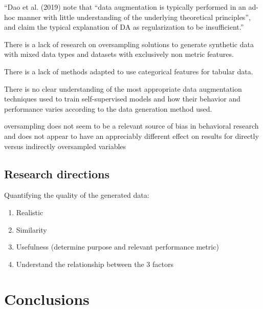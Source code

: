 \documentclass[parskip=full]{scrartcl}
\begin{document}
``Dao et al. (2019) note that ``data augmentation is typically performed in an
ad-hoc manner with little understanding of the underlying theoretical
principles'', and claim the typical explanation of DA as regularization to be
insufficient.''~\cite{feng2021survey}

There is a lack of research on oversampling solutions to generate synthetic
data with mixed data types and datasets with exclusively non metric features.

There is a lack of methods adapted to use categorical features for tabular
data.



There is no clear understanding of the most appropriate data augmentation
techniques used to train self-supervised models and how their behavior and
performance varies according to the data generation method used.


oversampling does not seem to be a relevant source of bias in behavioral
research and does not appear to have an appreciably different effect on
results for directly versus indirectly oversampled
variables~\cite{hauner2014latent}


\subsection{Research directions}


Quantifying the quality of the generated data:

\begin{enumerate}
    \item Realistic
    \item Similarity
    \item Usefulness (determine purpose and relevant performance metric)
    \item Understand the relationship between the 3 factors
\end{enumerate}

\section{Conclusions}~\label{sec:conclusions}

\printbibliography
\end{document}
